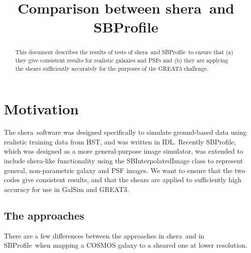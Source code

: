 \documentclass[preprint]{aastex}
\newcommand{\shera}{{\sc shera}}
\newcommand{\sbp}{SBProfile}
\begin{document}
\title{Comparison between \shera\ and \sbp}

\begin{abstract}
This document describes the results of tests of \shera\ and \sbp\ to
ensure that (a) they give consistent results for realistic galaxies
and PSFs and (b) they are applying the shears sufficiently accurately
for the purposes of the GREAT3 challenge.
\end{abstract}

\section{Motivation}

The \shera\ software was designed specifically to simulate 
ground-based data using realistic training data from HST, and was
written in IDL.  Recently \sbp, which was designed as a more
general-purpose image simulator, was extended to include \shera-like
functionality using the SBInterpolatedImage class to represent general, non-parametric galaxy and
PSF images.  We
want to ensure that the two codes give consistent results, and that
the shears are applied to sufficiently high accuracy for use in GalSim
and GREAT3.

\subsection{The approaches}

There are a few differences between the approaches in \shera\ and in
\sbp\ when mapping a COSMOS galaxy to a sheared one at lower
resolution.  
\end{document}
